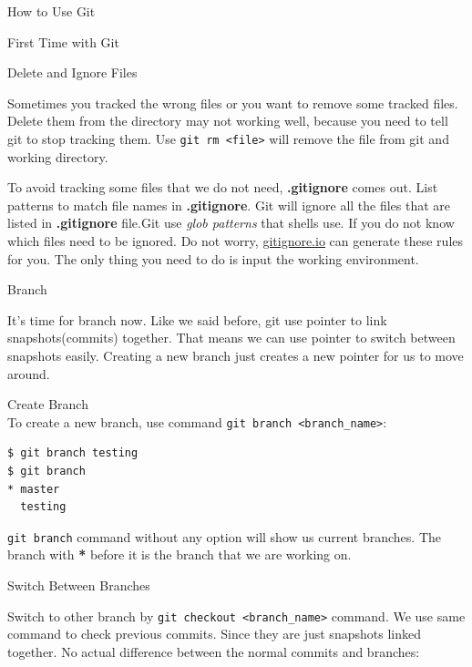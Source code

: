 \documentclass[10pt, a4papaer]{article}
\begin{document}
\begin{section}{How to Use Git}
\begin{subsection}{First Time with Git}
\begin{subsubsection}{Delete and Ignore Files}

Sometimes you tracked the wrong files or you want to remove some tracked files.
Delete them from the directory may not working well, because you need to tell
git to stop tracking them. Use \verb|git rm <file>| will remove the file from git
and working directory.

To avoid tracking some files that we do not need, \textbf{.gitignore} comes out.
List patterns to match file names in \textbf{.gitignore}. Git will ignore all
the files that are listed in \textbf{.gitignore} file.Git use \textit{glob patterns}
that shells use. If you do not know which files need to be ignored. Do not worry,
\href{https://www.gitignore.io/}{\underline{gitignore.io}} can generate these
rules for you. The only thing you need to do is input the working environment.
\end{subsubsection}
\end{subsection}

\begin{subsection}{Branch}
    
It's time for branch now. Like we said before, git use pointer to link snapshots(commits)
together. That means we can use pointer to switch between snapshots easily. Creating
a new branch just creates a new pointer for us to move around.

\begin{paragraph}{Create Branch\\}
To create a new branch, use command \verb|git branch <branch_name>|:

\begin{lstlisting}
$ git branch testing
$ git branch
* master
  testing
\end{lstlisting}

\verb|git branch| command without any option will show us current branches.
The branch with \textbf{*} before it is the branch that we are working on.

\end{paragraph}

\begin{paragraph}{Switch Between Branches\\}

Switch to other branch by \verb|git checkout <branch_name>| command. We 
use same command to check previous commits. Since they are just snapshots linked
together. No actual difference between the normal commits and branches:


\end{paragraph}
\end{subsection}
\end{section}
\end{document}
